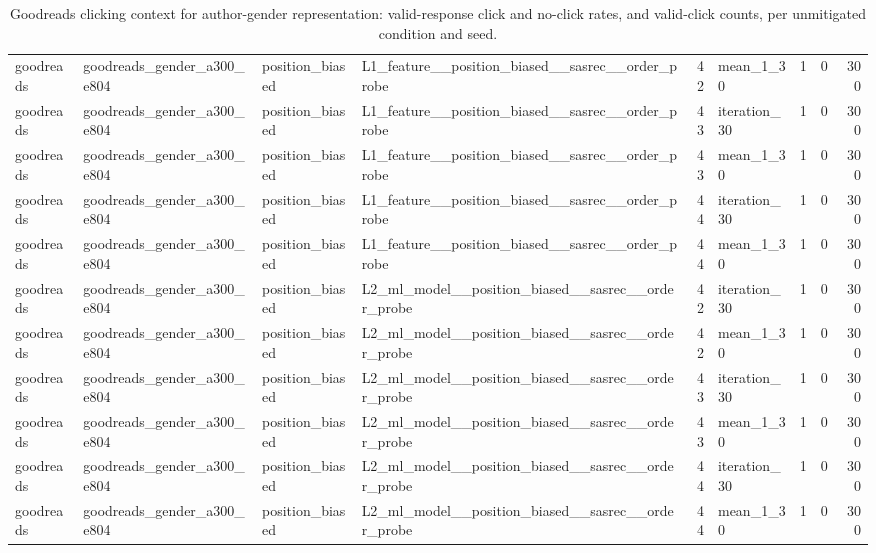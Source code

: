 \begin{table}[htbp!]
\begin{tabular}{llllrlrrr}
goodreads & goodreads\_gender\_a300\_e804 & position\_biased & L1\_feature\_\_position\_biased\_\_sasrec\_\_order\_probe & 42 & mean\_1\_30 & 1 & 0 & 300 \\
goodreads & goodreads\_gender\_a300\_e804 & position\_biased & L1\_feature\_\_position\_biased\_\_sasrec\_\_order\_probe & 43 & iteration\_30 & 1 & 0 & 300 \\
goodreads & goodreads\_gender\_a300\_e804 & position\_biased & L1\_feature\_\_position\_biased\_\_sasrec\_\_order\_probe & 43 & mean\_1\_30 & 1 & 0 & 300 \\
goodreads & goodreads\_gender\_a300\_e804 & position\_biased & L1\_feature\_\_position\_biased\_\_sasrec\_\_order\_probe & 44 & iteration\_30 & 1 & 0 & 300 \\
goodreads & goodreads\_gender\_a300\_e804 & position\_biased & L1\_feature\_\_position\_biased\_\_sasrec\_\_order\_probe & 44 & mean\_1\_30 & 1 & 0 & 300 \\
goodreads & goodreads\_gender\_a300\_e804 & position\_biased & L2\_ml\_model\_\_position\_biased\_\_sasrec\_\_order\_probe & 42 & iteration\_30 & 1 & 0 & 300 \\
goodreads & goodreads\_gender\_a300\_e804 & position\_biased & L2\_ml\_model\_\_position\_biased\_\_sasrec\_\_order\_probe & 42 & mean\_1\_30 & 1 & 0 & 300 \\
goodreads & goodreads\_gender\_a300\_e804 & position\_biased & L2\_ml\_model\_\_position\_biased\_\_sasrec\_\_order\_probe & 43 & iteration\_30 & 1 & 0 & 300 \\
goodreads & goodreads\_gender\_a300\_e804 & position\_biased & L2\_ml\_model\_\_position\_biased\_\_sasrec\_\_order\_probe & 43 & mean\_1\_30 & 1 & 0 & 300 \\
goodreads & goodreads\_gender\_a300\_e804 & position\_biased & L2\_ml\_model\_\_position\_biased\_\_sasrec\_\_order\_probe & 44 & iteration\_30 & 1 & 0 & 300 \\
goodreads & goodreads\_gender\_a300\_e804 & position\_biased & L2\_ml\_model\_\_position\_biased\_\_sasrec\_\_order\_probe & 44 & mean\_1\_30 & 1 & 0 & 300 \\
\hline
\end{tabular}
\caption{Goodreads clicking context for author-gender representation: valid-response click and no-click rates, and valid-click counts, per unmitigated condition and seed.}
\label{chap:results:tab:rq7_click_behaviour_summaries}
\end{table}

